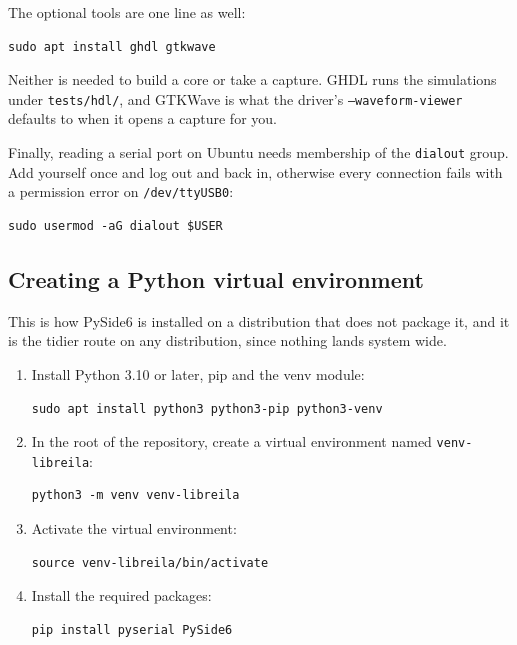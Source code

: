 \documentclass[../manual.tex]{subfiles}
\begin{document}
The optional tools are one line as well:

\begin{lstlisting}
sudo apt install ghdl gtkwave
\end{lstlisting}

Neither is needed to build a core or take a capture. GHDL runs the simulations under \texttt{tests/hdl/}, and GTKWave is what the driver's \texttt{--waveform-viewer} defaults to when it opens a capture for you.

Finally, reading a serial port on Ubuntu needs membership of the \texttt{dialout} group. Add yourself once and log out and back in, otherwise every connection fails with a permission error on \texttt{/dev/ttyUSB0}:

\begin{lstlisting}
sudo usermod -aG dialout $USER
\end{lstlisting}

\subsection{Creating a Python virtual environment}
\label{sec:started_venv}

This is how PySide6 is installed on a distribution that does not package it, and it is the tidier route on any distribution, since nothing lands system wide.

\begin{enumerate}
    \item Install Python 3.10 or later, pip and the venv module:
    \begin{lstlisting}
sudo apt install python3 python3-pip python3-venv
    \end{lstlisting}
    \item In the root of the repository, create a virtual environment named \texttt{venv-libreila}:
    \begin{lstlisting}
python3 -m venv venv-libreila
    \end{lstlisting}
    \item Activate the virtual environment:
    \begin{lstlisting}
source venv-libreila/bin/activate
    \end{lstlisting}
    \item Install the required packages:
    \begin{lstlisting}
pip install pyserial PySide6
    \end{lstlisting}
\end{enumerate}
\end{document}
